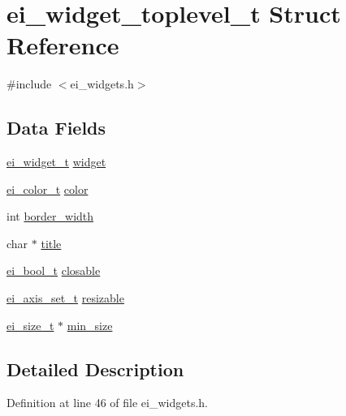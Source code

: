 \hypertarget{structei__widget__toplevel__t}{\section{ei\-\_\-widget\-\_\-toplevel\-\_\-t Struct Reference}
\label{structei__widget__toplevel__t}
}


{\ttfamily \#include $<$ei\-\_\-widgets.\-h$>$}

\subsection*{Data Fields}
\begin{DoxyCompactItemize}
\item 
\hyperlink{structei__widget__t}{ei\-\_\-widget\-\_\-t} \hyperlink{structei__widget__toplevel__t_a3babaea121cf413ae2020cea768479b0}{widget}
\item 
\hyperlink{structei__color__t}{ei\-\_\-color\-\_\-t} \hyperlink{structei__widget__toplevel__t_a4004d31b3b9d5e6a2f80bca288c1c31b}{color}
\item 
int \hyperlink{structei__widget__toplevel__t_ac3487d8274c78d4bb79a34d98d54f86e}{border\-\_\-width}
\item 
char $\ast$ \hyperlink{structei__widget__toplevel__t_a2dba56e4fa0df714a546e4175fe3563e}{title}
\item 
\hyperlink{ei__types_8h_a383b9af13bd6a0a893096ead3c4d8e28}{ei\-\_\-bool\-\_\-t} \hyperlink{structei__widget__toplevel__t_a3e8fb2c934a21fd631ddbe2c8ff272db}{closable}
\item 
\hyperlink{ei__types_8h_ab5d9ff46ba9b2c9fa6d6fbd2594c6439}{ei\-\_\-axis\-\_\-set\-\_\-t} \hyperlink{structei__widget__toplevel__t_a2959bf91c46bfbf8772cd7974168fd1b}{resizable}
\item 
\hyperlink{structei__size__t}{ei\-\_\-size\-\_\-t} $\ast$ \hyperlink{structei__widget__toplevel__t_afe0e3eb72d1504e32f13a163a51d5149}{min\-\_\-size}
\end{DoxyCompactItemize}


\subsection{Detailed Description}


Definition at line 46 of file ei\-\_\-widgets.\-h.



